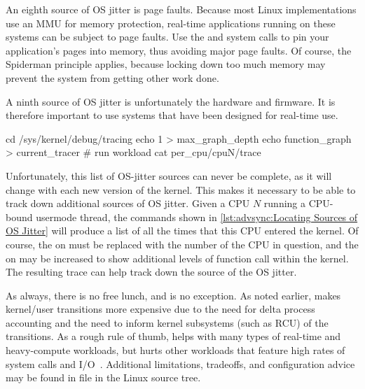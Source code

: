 An eighth source of OS jitter is page faults.
Because most Linux implementations use an MMU for memory protection,
real-time applications running on these systems can be subject
to page faults.
Use the  and  system calls to pin your
application's pages into memory, thus avoiding major page faults.
Of course, the Spiderman principle applies, because locking down
too much memory may prevent the system from getting other work done.

A ninth source of OS jitter is unfortunately the hardware and firmware.
It is therefore important to use systems that have been designed for
real-time use.

\begin{listing}
\begin{fcvlabel}
\begin{VerbatimL}[commandchars=\\\[\]]
cd /sys/kernel/debug/tracing
echo 1 > max_graph_depth		\lnlbl[echo1]
echo function_graph > current_tracer
# run workload
cat per_cpu/cpuN/trace			\lnlbl[cat]
\end{VerbatimL}
\end{fcvlabel}
\caption{Locating Sources of OS Jitter}
\label{lst:advsync:Locating Sources of OS Jitter}
\end{listing}

\begin{fcvref}
Unfortunately, this list of OS-jitter sources can never be complete,
as it will change with each new version of the kernel.
This makes it necessary to be able to track down additional sources
of OS jitter.
Given a CPU $N$ running a CPU-bound usermode thread, the
commands shown in
\cref{lst:advsync:Locating Sources of OS Jitter}
will produce a list of all the times that this CPU entered the kernel.
Of course, the  on  must be replaced with the
number of the CPU in question, and the  on  may be
increased
to show additional levels of function call within the kernel.
The resulting trace can help track down the source of the OS jitter.
\end{fcvref}

As always, there is no free lunch, and  is no exception.
As noted earlier,
 makes kernel/user transitions more expensive due to the
need for delta process accounting and the need to inform kernel subsystems
(such as RCU) of the transitions.
As a rough rule of thumb,  helps with many types of
real-time and heavy-compute workloads, but hurts other workloads
that feature high rates of system calls and
I/O~\cite{AbdullahAljuhni2018nohzfull}.
Additional limitations, tradeoffs, and configuration advice may be
found in  file in the Linux source tree.

